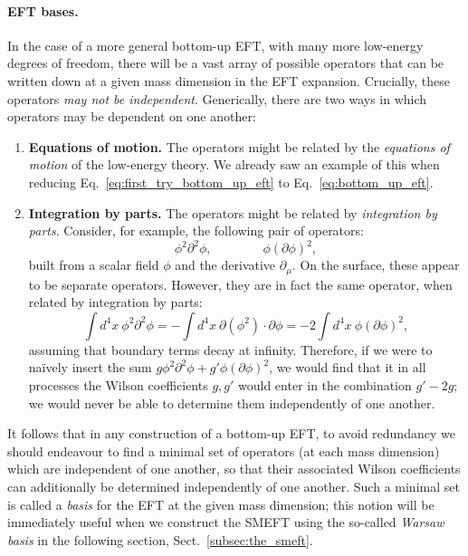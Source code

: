 \documentclass[withindex,glossary]{cam-thesis}
\begin{document}
\paragraph{EFT bases.} In the case of a more general bottom-up EFT, with many more low-energy degrees of freedom, there will be a vast array of possible operators that can be written down at a given mass dimension in the EFT expansion. Crucially, these operators \textit{may not be independent}. Generically, there are two ways in which operators may be dependent on one another:
\begin{enumerate}[label = (\roman*)]
\item \textbf{Equations of motion.} The operators might be related by the \textit{equations of motion} of the low-energy theory. We already saw an example of this when reducing Eq.~\eqref{eq:first_try_bottom_up_eft} to Eq.~\eqref{eq:bottom_up_eft}.
\item \textbf{Integration by parts.} The operators might be related by \textit{integration by parts}. Consider, for example, the following pair of operators:
\begin{equation}
\phi^2 \partial^2 \phi, \qquad \qquad \phi (\partial\phi)^2,
\end{equation}
built from a scalar field $\phi$ and the derivative $\partial_{\mu}$. On the surface, these appear to be separate operators. However, they are in fact the same operator, when related by integration by parts:
\begin{equation}
\int d^4x\ \phi^2 \partial^2 \phi = -\int d^4x\ \partial(\phi^2) \cdot \partial \phi = -2 \int d^4x\ \phi (\partial \phi)^2,
\end{equation}
assuming that boundary terms decay at infinity. Therefore, if we were to na\"{i}vely insert the sum $g \phi^2 \partial^2 \phi + g' \phi (\partial \phi)^2$, we would find that it in all processes the Wilson coefficients $g, g'$ would enter in the combination $g' - 2g$; we would never be able to determine them independently of one another.
\end{enumerate}
It follows that in any construction of a bottom-up EFT, to avoid redundancy we should endeavour to find a minimal set of operators (at each mass dimension) which are independent of one another, so that their associated Wilson coefficients can additionally be determined independently of one another. Such a minimal set is called a \textit{basis} for the EFT at the given mass dimension; this notion will be immediately useful when we construct the SMEFT using the so-called \textit{Warsaw basis} in the following section, Sect.~\ref{subsec:the_smeft}.
\end{document}
